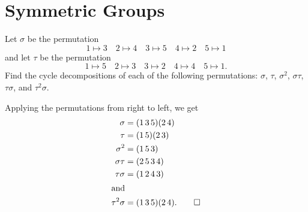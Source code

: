 \section{Symmetric Groups}

\label{exercise:intro-group:perm1}
Let $\sigma$ be the permutation
\begin{equation*}
  1\mapsto3 \quad 2\mapsto4 \quad 3\mapsto5 \quad 4\mapsto2 \quad 5\mapsto1
\end{equation*}
and let $\tau$ be the permutation
\begin{equation*}
  1\mapsto5 \quad 2\mapsto3 \quad 3\mapsto2 \quad 4\mapsto4 \quad 5\mapsto1.
\end{equation*}
Find the cycle decompositions of each of the following permutations:
$\sigma$, $\tau$, $\sigma^2$, $\sigma\tau$, $\tau\sigma$, and
$\tau^2\sigma$.
\begin{solution}
  Applying the permutations from right to left, we get
  \begin{align*}
    \sigma &= (1\,3\,5)(2\,4) \\
    \tau &= (1\,5)(2\,3) \\
    \sigma^2 &= (1\,5\,3) \\
    \sigma\tau &= (2\,5\,3\,4) \\
    \tau\sigma &= (1\,2\,4\,3) \\
    \intertext{and}
    \tau^2\sigma &= (1\,3\,5)(2\,4). \qedhere
  \end{align*}
\end{solution}

